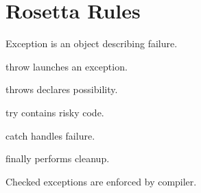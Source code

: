 \documentclass[11pt,a4paper]{book}
\begin{document}

\section{Rosetta Rules}

\begin{rosettarule}

Exception is an object describing failure.

\end{rosettarule}


\begin{rosettarule}

throw launches an exception.

\end{rosettarule}


\begin{rosettarule}

throws declares possibility.

\end{rosettarule}


\begin{rosettarule}

try contains risky code.

\end{rosettarule}


\begin{rosettarule}

catch handles failure.

\end{rosettarule}


\begin{rosettarule}

finally performs cleanup.

\end{rosettarule}


\begin{rosettarule}

Checked exceptions are enforced by compiler.

\end{rosettarule}
\end{document}
